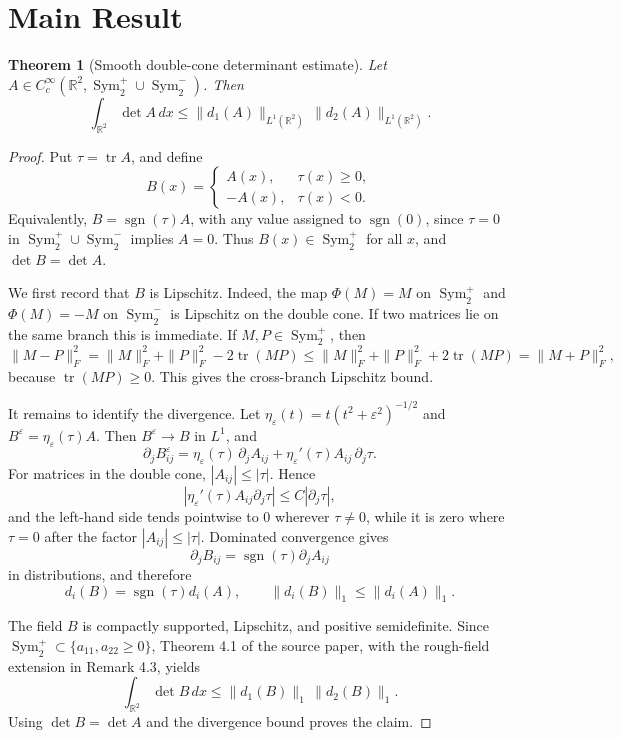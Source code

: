 \documentclass[11pt]{article}
\newtheorem{theorem}{Theorem}
\newcommand{\R}{\mathbb R}
\newcommand{\Sym}{\operatorname{Sym}}
\newcommand{\tr}{\operatorname{tr}}
\newcommand{\sgn}{\operatorname{sgn}}
\begin{document}
\section*{Main Result}

\begin{theorem}[Smooth double-cone determinant estimate]
Let \(A\in C_c^\infty(\R^2,\Sym_2^+\cup\Sym_2^-)\). Then
\[
  \int_{\R^2}\det A\,dx
  \leq
  \|d_1(A)\|_{L^1(\R^2)}\,\|d_2(A)\|_{L^1(\R^2)} .
\]
\end{theorem}

\begin{proof}
Put \(\tau=\tr A\), and define
\[
  B(x)=
  \begin{cases}
  A(x), & \tau(x)\geq 0,\\
  -A(x), & \tau(x)<0.
  \end{cases}
\]
Equivalently, \(B=\sgn(\tau)A\), with any value assigned to \(\sgn(0)\), since
\(\tau=0\) in \(\Sym_2^+\cup\Sym_2^-\) implies \(A=0\).
Thus \(B(x)\in\Sym_2^+\) for all \(x\), and \(\det B=\det A\).

We first record that \(B\) is Lipschitz. Indeed, the map
\(\Phi(M)=M\) on \(\Sym_2^+\) and \(\Phi(M)=-M\) on \(\Sym_2^-\) is Lipschitz
on the double cone. If two matrices lie on the same branch this is immediate.
If \(M,P\in\Sym_2^+\), then
\[
  \|M-P\|_F^2
  =\|M\|_F^2+\|P\|_F^2-2\operatorname{tr}(MP)
  \leq
  \|M\|_F^2+\|P\|_F^2+2\operatorname{tr}(MP)
  =\|M+P\|_F^2,
\]
because \(\operatorname{tr}(MP)\geq0\). This gives the cross-branch Lipschitz
bound.

It remains to identify the divergence. Let
\(\eta_\varepsilon(t)=t(t^2+\varepsilon^2)^{-1/2}\) and
\(B^\varepsilon=\eta_\varepsilon(\tau)A\). Then \(B^\varepsilon\to B\) in
\(L^1\), and
\[
  \partial_j B^\varepsilon_{ij}
  =
  \eta_\varepsilon(\tau)\,\partial_j A_{ij}
  +
  \eta_\varepsilon'(\tau) A_{ij}\,\partial_j\tau .
\]
For matrices in the double cone, \(|A_{ij}|\leq |\tau|\). Hence
\[
  |\eta_\varepsilon'(\tau) A_{ij}\partial_j\tau|
  \leq C|\partial_j\tau|,
\]
and the left-hand side tends pointwise to \(0\) wherever \(\tau\neq0\), while it
is zero where \(\tau=0\) after the factor \(|A_{ij}|\leq|\tau|\). Dominated
convergence gives
\[
  \partial_j B_{ij}=\sgn(\tau)\partial_j A_{ij}
\]
in distributions, and therefore
\[
  d_i(B)=\sgn(\tau)d_i(A),\qquad
  \|d_i(B)\|_1\leq \|d_i(A)\|_1 .
\]

The field \(B\) is compactly supported, Lipschitz, and positive semidefinite.
Since \(\Sym_2^+\subset\{a_{11},a_{22}\geq0\}\), Theorem 4.1 of the source
paper, with the rough-field extension in Remark 4.3, yields
\[
  \int_{\R^2}\det B\,dx
  \leq
  \|d_1(B)\|_1\,\|d_2(B)\|_1 .
\]
Using \(\det B=\det A\) and the divergence bound proves the claim.
\end{proof}
\end{document}
